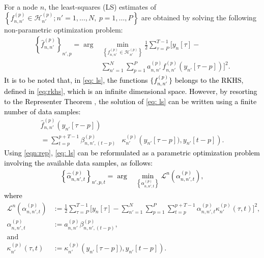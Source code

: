 \documentclass[conference]{IEEEtran}
\def\cbr#1{\left\lbrace #1 \right\rbrace}
\def\sbr#1{\biggl [ #1 \biggr ]}
\def\nbr#1{\left( #1\right)}
\newcommand{\cB}[1]{\textcolor{black}{#1}}
\def\p {{(p)}}
\def\n {{n'}}
\begin{document}
For a node $n$, the least-squares (LS) estimates of $\cbr{{f}_{n,\n}^{\p}\in \mathcal{H}_{n'}^\p;\n=1,\dots,N,~p=1,\dots,P}$ are obtained by solving the following non-parametric optimization problem:
 \begin{align} \label{eq: ls}
\cbr{\widehat{{f}}_{n,\n}^\p}_{\n,p}=
\arg &\min_{\cbr{{f}_{n,\n}^{\p}\in \mathcal{H}_\n^\p}} \frac{1}{2}\sum_{\tau=P}^{T-1}\sbr{y_{n}[\tau]- \nonumber\\ &\sum_{\n = 1}^{N} \sum_{p = 1}^{P}a_{n,\n}^\p {f}_{n,\n}^\p(y_\n[\tau-p])}^2.
\end{align}
\cB{It is to be noted that, in \eqref{eq: ls}, the functions $\{{f}_{n,\n}^{\p}\}$ belongs to the RKHS, defined in \eqref{eq:rkhs}, which is an infinite dimensional space. 
However, by resorting to the Representer Theorem} \cite{ageolk2000}, \cB{the solution of \eqref{eq: ls} can be written using a finite number of data samples:}  
\begin{align}\label{eqn:rep}
    \widehat{f}_{n,n'}^{\p}\nbr{y_\n[\tau-p]}~~~~&\nonumber\\
    =\sum_{t=p}^{p+T-1}\beta^\p_{n,n',(t-p)}&\kappa^\p_{n'}\nbr{y_\n[\tau-p]),y_\n[t-p]}.
\end{align}
\cB{Using \eqref{eqn:rep}, \eqref{eq: ls} can be reformulated as a parametric optimization problem involving the available data samples, as follows: 
 \begin{align} \label{eq: ParOpt}
\cbr{\widehat{\alpha}_{n,\n,t}^\p}_{\n,p,t}=
\arg &\min_{\cbr{\alpha_{n,\n,t}^\p}} \mathcal{L}^n\nbr{\alpha_{n,\n,t}^\p},
\end{align}
where}
\begin{align} \label{eq: ls2}
\mathcal{L}^n\nbr{\alpha_{n,\n,t}^\p}&:= \frac{1}{2}\sum_{\tau=P}^{T-1}\sbr{y_{n}[\tau]- \sum_{\n = 1}^{N} \sum_{p = 1}^{P}\sum_{t=p}^{p+T-1}{\alpha}^\p_{n,n',t}\kappa^\p_{n'}\nbr{\tau,t}}^2,\\
    \alpha_{n,\n,t}^\p&:=a_{n,\n}^\p\beta_{n,\n,(t-p)}^\p,  \label{eqn:alpha}\\
    \text{and}~~~~~~~~~&\nonumber\\
    \kappa^\p_{n'}\nbr{\tau,t}&:=\kappa^\p_{n'}\nbr{y_\n[\tau-p]),y_\n[t-p]}. \label{eqn:kappa}
\end{align}
\end{document}
